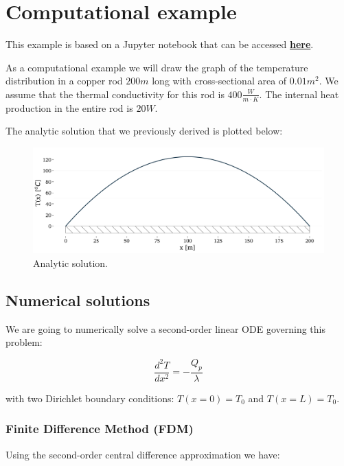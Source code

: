 \documentclass[20pt]{report}
\begin{document}
\section*{Computational example}

This example is based on a Jupyter notebook that can be accessed \href{https://github.com/camillejr/fluid-dynamics-and-transport-phenomena/blob/master/transport-phenomena-with-Python/code/example-heat-transfer-in-a-rod.ipynb}{\textbf{here}}.

As a computational example we will draw the graph of the temperature distribution in a copper rod $200m$ long with cross-sectional area of $0.01m^2$. We assume that the thermal conductivity for this rod is $400 \frac{W}{m \cdot K}$. The internal heat production in the entire rod is $20 W$.

The analytic solution that we previously derived is plotted below:

\begin{figure}[H]
\centering\includegraphics[width=12cm]{plots/example-heat-transfer-in-a-rod-analytic.png}
\caption{Analytic solution.}
\label{fig:analytic-solution}
\end{figure}

\subsection*{Numerical solutions}

We are going to numerically solve a second-order linear ODE governing this problem:

$$\frac{d^2 T}{dx^2} = - \frac{Q_p}{\lambda}$$

with two Dirichlet boundary conditions: $T(x=0) = T_0$ and $T(x=L) = T_0$.

\subsubsection*{Finite Difference Method (FDM)}

Using the second-order central difference approximation we have:
\end{document}

